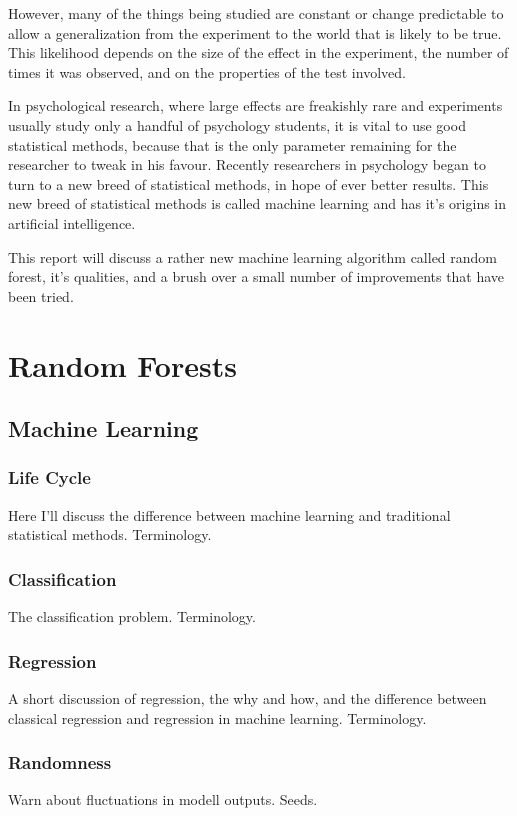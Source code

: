 \documentclass[a4paper,man,12pt,apacite]{apa6} %
\begin{document}
However, many of the things being studied are constant or change
predictable to allow a generalization from the experiment to the world
that is likely to be true. This likelihood depends on the size of the
effect in the experiment, the number of times it was observed, and on
the properties of the test involved.

In psychological research, where large effects are freakishly rare and
experiments usually study only a handful of psychology students, it is
vital to use good statistical methods, because that is the only parameter
remaining for the researcher to tweak in his favour.
Recently researchers in psychology began to turn to a new breed of
statistical methods, in hope of ever better results. This new breed of
statistical methods is called machine learning and has it's origins in
artificial intelligence.

This report will discuss a rather new machine learning algorithm called
random forest, it's qualities, and a brush over a small number of
improvements that have been tried.

\section{Random Forests}

\subsection{Machine Learning}

\subsubsection{Life Cycle}
Here I'll discuss the difference between machine learning and traditional
statistical methods. Terminology.

\subsubsection{Classification}
The classification problem. Terminology.

\subsubsection{Regression}
A short discussion of regression, the why and how, and the difference
between classical regression and regression in machine learning.
Terminology.

\subsubsection{Randomness}
Warn about fluctuations in modell outputs. Seeds.
\end{document}
